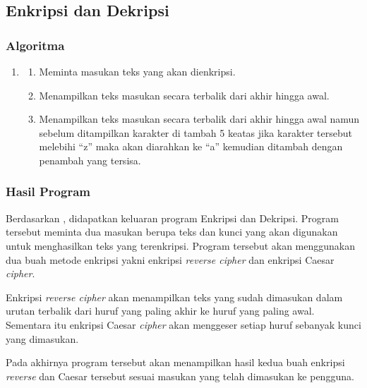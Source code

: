 \documentclass{subfiles}
\begin{document}
\subsection{Enkripsi dan Dekripsi}
\subsubsection{Algoritma}
\begin{enumerate}
    \item []
    \begin{enumerate}
        \item{Meminta masukan teks yang akan dienkripsi.}
        \item{Menampilkan teks masukan secara terbalik dari akhir hingga awal.}
        \item{Menampilkan teks masukan secara terbalik dari akhir hingga awal namun sebelum
                    ditampilkan karakter di tambah 5 keatas jika karakter tersebut melebihi ``z'' maka
                    akan diarahkan ke ``a'' kemudian ditambah dengan penambah yang tersisa.}
    \end{enumerate}
\end{enumerate}
\newpage
\subsubsectionf{\Flowchart}
\vspace{0.5ex}

\subsubsection{{\Source} {\sCode}}
\vspace{1ex}
\subsubsection{Hasil Program}
\begin{indentpar}
    \hspace{\parindent}Berdasarkan , didapatkan keluaran program Enkripsi dan Dekripsi. Program tersebut meminta dua masukan berupa teks dan kunci yang akan digunakan untuk menghasilkan teks yang terenkripsi. Program tersebut akan menggunakan dua buah metode enkripsi yakni enkripsi \textit{reverse cipher} dan enkripsi Caesar \textit{cipher}.

    Enkripsi \textit{reverse cipher} akan menampilkan teks yang sudah dimasukan dalam urutan terbalik dari huruf yang paling akhir ke huruf yang paling awal. Sementara itu enkripsi Caesar \textit{cipher} akan menggeser setiap huruf sebanyak kunci yang dimasukan.

    Pada akhirnya program tersebut akan menampilkan hasil kedua buah enkripsi \textit{reverse} {\cipher} dan Caesar {\cipher} tersebut sesuai masukan yang telah dimasukan ke pengguna.
\end{indentpar}
\end{document}
